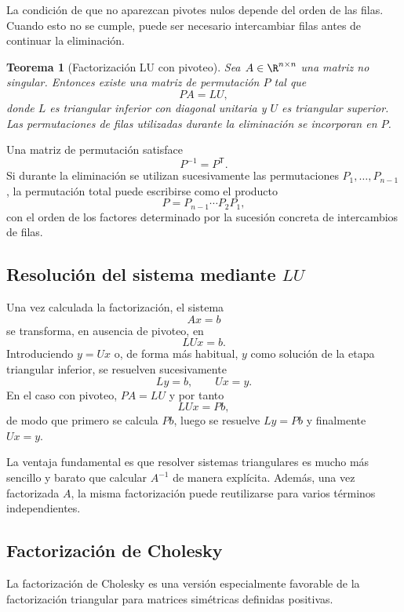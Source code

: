 \documentclass[12pt]{article}
\newtheorem{teorema}{Teorema}
\begin{document}
\begin{observacion}
La condición de que no aparezcan pivotes nulos depende del orden de las filas. Cuando esto no se cumple, puede ser necesario intercambiar filas antes de continuar la eliminación.
\end{observacion}

\begin{teorema}[Factorización LU con pivoteo]
Sea $A\in\R^{n\times n}$ una matriz no singular. Entonces existe una matriz de permutación $P$ tal que
\[
    PA=LU,
\]
donde $L$ es triangular inferior con diagonal unitaria y $U$ es triangular superior. Las permutaciones de filas utilizadas durante la eliminación se incorporan en $P$.
\end{teorema}

Una matriz de permutación satisface
\[
    P^{-1}=P^{\mathsf T}.
\]
Si durante la eliminación se utilizan sucesivamente las permutaciones $P_1,\ldots,P_{n-1}$, la permutación total puede escribirse como el producto
\[
    P=P_{n-1}\cdots P_2P_1,
\]
con el orden de los factores determinado por la sucesión concreta de intercambios de filas.

\subsection*{Resolución del sistema mediante $LU$}

Una vez calculada la factorización, el sistema
\[
    Ax=b
\]
se transforma, en ausencia de pivoteo, en
\[
    LUx=b.
\]
Introduciendo $y=Ux$ o, de forma más habitual, $y$ como solución de la etapa triangular inferior, se resuelven sucesivamente
\[
    Ly=b,
    \qquad
    Ux=y.
\]
En el caso con pivoteo, $PA=LU$ y por tanto
\[
    LUx=Pb,
\]
de modo que primero se calcula $Pb$, luego se resuelve $Ly=Pb$ y finalmente $Ux=y$.

La ventaja fundamental es que resolver sistemas triangulares es mucho más sencillo y barato que calcular $A^{-1}$ de manera explícita. Además, una vez factorizada $A$, la misma factorización puede reutilizarse para varios términos independientes.

\subsection*{Factorización de Cholesky}

La factorización de Cholesky es una versión especialmente favorable de la factorización triangular para matrices simétricas definidas positivas.
\end{document}
